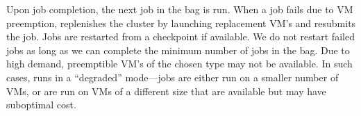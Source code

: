 Upon job completion, the next job in the bag is run. 
When a job fails due to VM preemption, \sysname replenishes the cluster by launching replacement VM's and resubmits the job. 
Jobs are restarted from a checkpoint if available.
We do not restart failed jobs as long as we can complete the minimum number of jobs in the bag.
Due to high demand, preemptible VM's of the chosen type may not be available.
In such cases, \sysname runs in a ``degraded'' mode---jobs are either run on a smaller number of VMs, or are run on VMs of a different size that are available but may have suboptimal cost.  

